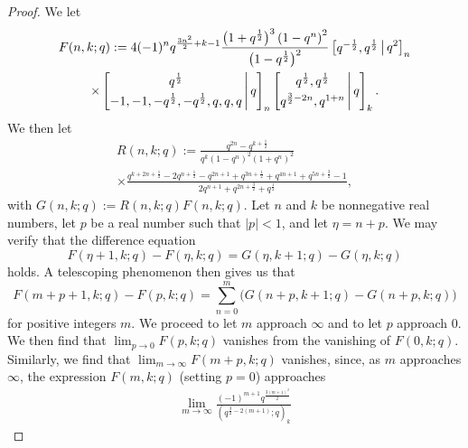 \documentclass[12pt]{article}
\begin{document}
\begin{proof}
 We let 
\begin{multline*}
 F(n, k; q) := 4 (-1)^n q^{\frac{3 n^2}{2} + k -1} 
 \frac{ \big(1 + q^{\frac{1}{2}} \big)^3 \left(1-q^n\right)^2}{ \big(1 - q^{\frac{1}{2}} \big)^2} 
 \left[ \begin{matrix} q^{-\frac{1}{2}}, q^{\frac{1}{2}} 
 \end{matrix} \, \big| \, q^2 \right]_{n} \\ 
 \times \left[ \begin{matrix} q^{\frac{1}{2}} \vspace{1mm} \\ 
 -1, -1, -q^{\frac{1}{2}}, -q^{\frac{1}{2}}, q, q, q \end{matrix} \, \Bigg| \, q \right]_{n} 
 \left[ \begin{matrix} q^{\frac{1}{2}}, q^{\frac{1}{2}} \vspace{1mm} \\ 
 q^{\frac{3}{2}-2n}, q^{1+n} \end{matrix} \, \Bigg| \, q \right]_{k}. 
\end{multline*}
 We then let 
\begin{multline*}
 R(n, k; q) := \frac{q^{2 n}-q^{k+\frac{1}{2}}}{q^{k} \left(1-q^n\right)^2 \left(1 + q^n\right)^2} \\ 
 \times \frac{ q^{k+2 n+\frac{1}{2}}-2 q^{n+\frac{1}{2}}-q^{2 n+1}+q^{3
 n+\frac{1}{2}}+q^{4 n+1}+q^{5
 n+\frac{3}{2}}-1}{ 2 q^{n+1}+q^{2 n+\frac{3}{2}} + q^{\frac{1}{2}}}, 
\end{multline*}
 with $G(n, k; q) := R(n, k; q) F(n, k; q)$. 
 Let $n$ and $k$ be nonnegative real numbers, let $p$ be a real number such that $|p| < 1$, 
 and let $\eta = n + p$. 
 We may verify that the difference equation 
 $$ F(\eta + 1, k; q) - F(\eta, k; q) = G(\eta, k + 1; q) - G(\eta, k; q ) $$ 
 holds. A telescoping phenomenon 
 then gives us that 
 $$ F(m + p + 1, k; q) - F(p, k; q)
 = \sum_{n = 0}^{m} \big( G(n+p,k+1;q) - G(n+p,k;q) \big) $$ 
 for positive integers $m$. 
 We proceed to let $m$ approach $\infty$
 and to let $p$ approach $0$. 
 We then find that 
 	$\lim_{p \to 0} F(p, k; q)$ vanishes from the vanishing of 
 $F(0, k; q)$. Similarly, we find that $\lim_{m \to \infty} F(m + p, k; q)$ 
 vanishes, since, as $m$ approaches $\infty$, the expression $F(m, k; q)$ (setting $p = 0$)
 approaches 
\begin{multline*}
 \lim_{m \to \infty} \frac{ (-1)^{m+1} q^{\frac{3 (m+1)^2 }{2}} }{ \left( q^{\frac{3}{2} - 2(m+1)}; q \right)_{k} } 

\end{multline*}
\end{proof}
\end{document}
